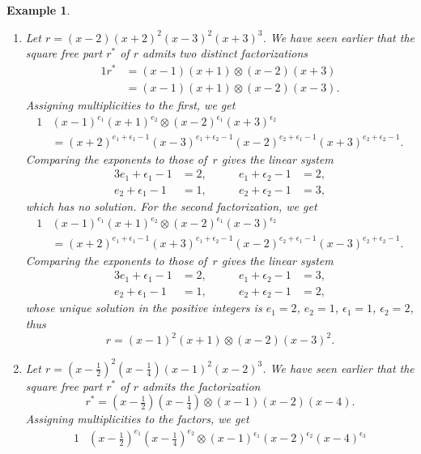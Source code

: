 \documentclass{sig-alternate}
\newtheorem{example}[theorem]{Example}
\begin{document}
\begin{example}
  \begin{enumerate}
  \item 
  Let $r=(x-2)(x+2)^2(x-3)^2(x+3)^3$.
  We have seen earlier that the square free part $r^\ast$ of $r$ admits
  two distinct factorizations
  \begin{alignat*}1
    r^\ast&=(x-1)(x+1)\otimes(x-2)(x+3)\\
         &=(x-1)(x+1)\otimes(x-2)(x-3).
  \end{alignat*}
  Assigning multiplicities to the first, we get
  \begin{alignat*}1
    &(x-1)^{e_1}(x+1)^{e_2}\otimes(x-2)^{\epsilon_1}(x+3)^{\epsilon_2}\\
    &=(x{+}2)^{e_1+\epsilon_1-1}(x{-}3)^{e_1+\epsilon_2-1}(x{-}2)^{e_2+\epsilon_1-1}(x{+}3)^{e_2+\epsilon_2-1}.
  \end{alignat*}
  Comparing the exponents to those of~$r$ gives the linear system
  \begin{alignat*}3
     e_1+\epsilon_1-1&=2,\qquad
    &e_1+\epsilon_2-1&=2,\\
     e_2+\epsilon_1-1&=1,\qquad
    &e_2+\epsilon_2-1&=3,
  \end{alignat*}
  which has no solution. For the second factorization, we get
  \begin{alignat*}1
    &(x-1)^{e_1}(x+1)^{e_2}\otimes(x-2)^{\epsilon_1}(x-3)^{\epsilon_2}\\
    &=(x{+}2)^{e_1+\epsilon_1-1}(x{+}3)^{e_1+\epsilon_2-1}(x{-}2)^{e_2+\epsilon_1-1}(x{-}3)^{e_2+\epsilon_2-1}.
  \end{alignat*}
  Comparing the exponents to those of~$r$ gives the linear system
  \begin{alignat*}3
    e_1+\epsilon_1-1&=2,\qquad
    &e_1+\epsilon_2-1&=3,\\
    e_2+\epsilon_1-1&=1,\qquad
    &e_2+\epsilon_2-1&=2,
  \end{alignat*}
  whose unique solution in the positive integers is $e_1=2$, $e_2=1$, $\epsilon_1=1$, $\epsilon_2=2$,
  thus
  \[
    r = (x-1)^2(x+1)\otimes(x-2)(x-3)^2.
  \]
  \item
    Let $r=(x-\tfrac12)^2(x-\tfrac14)(x-1)^2(x-2)^3$.
    We have seen earlier that the square free part $r^\ast$ of $r$ admits the factorization
    \[
      r^\ast= (x-\tfrac12)(x-\tfrac14)\otimes(x-1)(x-2)(x-4).
    \]
    Assigning multiplicities to the factors, we get
    \begin{alignat*}1
      &(x-\tfrac12)^{e_1}(x-\tfrac14)^{e_2}\otimes(x-1)^{\epsilon_1}(x-2)^{\epsilon_2}(x-4)^{\epsilon_3}\\

\end{alignat*}
\end{enumerate}
\end{example}
\end{document}
